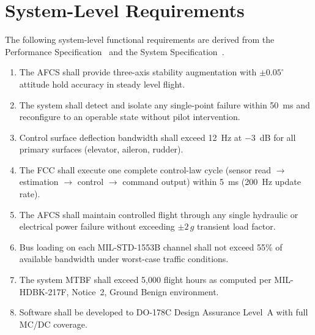 \section{System-Level Requirements}
The following system-level functional requirements are derived from the
Performance Specification~ and the System Specification~.

\begin{enumerate}[label=\req{\arabic*}, leftmargin=*, itemsep=6pt]
  \item \label{req:1}
    The AFCS shall provide three-axis stability augmentation with
    $\pm 0.05^\circ$ attitude hold accuracy in steady level flight.

  \item \label{req:2}
    The system shall detect and isolate any single-point failure within
    50~ms and reconfigure to an operable state without pilot intervention.

  \item \label{req:3}
    Control surface deflection bandwidth shall exceed 12~Hz at
    $-3$~dB for all primary surfaces (elevator, aileron, rudder).

  \item \label{req:4}
    The FCC shall execute one complete control-law cycle
    (sensor read $\rightarrow$ estimation $\rightarrow$ control
    $\rightarrow$ command output) within 5~ms (200~Hz update rate).

  \item \label{req:5}
    The AFCS shall maintain controlled flight through any single
    hydraulic or electrical power failure without exceeding
    $\pm 2\,g$ transient load factor.

  \item \label{req:6}
    Bus loading on each MIL-STD-1553B channel shall not exceed
    55\% of available bandwidth under worst-case traffic conditions.

  \item \label{req:7}
    The system MTBF shall exceed 5,000 flight hours as computed
    per MIL-HDBK-217F, Notice~2, Ground Benign environment.

  \item \label{req:8}
    Software shall be developed to DO-178C Design Assurance Level~A
    with full MC/DC coverage.
\end{enumerate}
